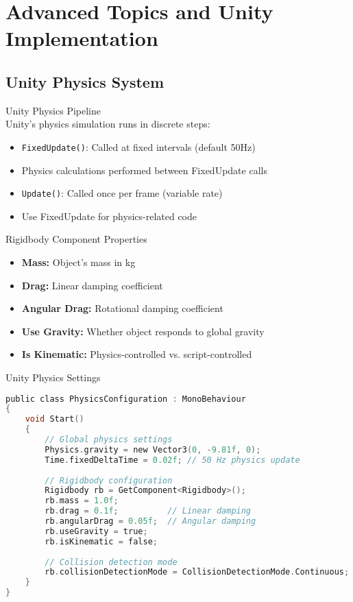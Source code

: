\section{Advanced Topics and Unity Implementation}

\subsection{Unity Physics System}

\begin{concept}{Unity Physics Pipeline}\\
    Unity's physics simulation runs in discrete steps:
    \begin{itemize}
        \item \texttt{FixedUpdate()}: Called at fixed intervals (default 50Hz)
        \item Physics calculations performed between FixedUpdate calls
        \item \texttt{Update()}: Called once per frame (variable rate)
        \item Use FixedUpdate for physics-related code
    \end{itemize}
\end{concept}

\begin{definition}{Rigidbody Component Properties}
    \begin{itemize}
        \item \textbf{Mass:} Object's mass in kg
        \item \textbf{Drag:} Linear damping coefficient
        \item \textbf{Angular Drag:} Rotational damping coefficient
        \item \textbf{Use Gravity:} Whether object responds to global gravity
        \item \textbf{Is Kinematic:} Physics-controlled vs. script-controlled
    \end{itemize}
\end{definition}

\begin{code}{Unity Physics Settings}\\
\begin{lstlisting}[language=C, style=basesmol]
public class PhysicsConfiguration : MonoBehaviour 
{
    void Start() 
    {
        // Global physics settings
        Physics.gravity = new Vector3(0, -9.81f, 0);
        Time.fixedDeltaTime = 0.02f; // 50 Hz physics update
        
        // Rigidbody configuration
        Rigidbody rb = GetComponent<Rigidbody>();
        rb.mass = 1.0f;
        rb.drag = 0.1f;          // Linear damping
        rb.angularDrag = 0.05f;  // Angular damping
        rb.useGravity = true;
        rb.isKinematic = false;
        
        // Collision detection mode
        rb.collisionDetectionMode = CollisionDetectionMode.Continuous;
    }
}
\end{lstlisting}
\end{code}

